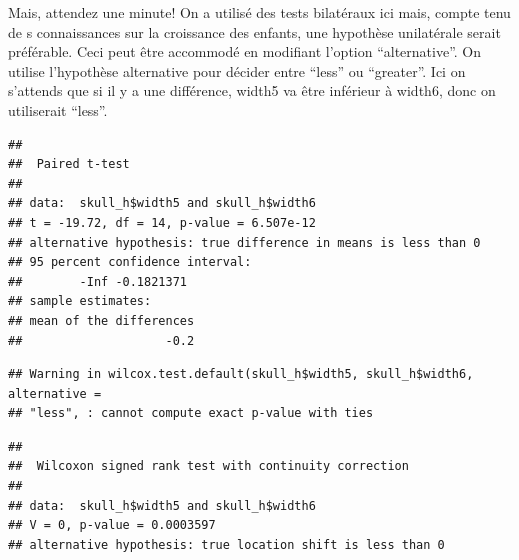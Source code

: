 \documentclass[
  12pt,
]{book}
\newenvironment{Shaded}{\begin{snugshade}}{\end{snugshade}}
\newcommand{\DataTypeTok}[1]{\textcolor[rgb]{0.13,0.29,0.53}{#1}}
\newcommand{\KeywordTok}[1]{\textcolor[rgb]{0.13,0.29,0.53}{\textbf{#1}}}
\newcommand{\NormalTok}[1]{#1}
\newcommand{\OperatorTok}[1]{\textcolor[rgb]{0.81,0.36,0.00}{\textbf{#1}}}
\newcommand{\OtherTok}[1]{\textcolor[rgb]{0.56,0.35,0.01}{#1}}
\newcommand{\StringTok}[1]{\textcolor[rgb]{0.31,0.60,0.02}{#1}}
\begin{document}
Mais, attendez une minute! On a utilisé des tests bilatéraux ici mais, compte tenu de s connaissances sur la croissance des enfants, une hypothèse unilatérale serait préférable. Ceci peut être accommodé en modifiant l'option ``alternative''. On utilise l'hypothèse alternative pour décider entre ``less'' ou ``greater''. Ici on s'attends que si il y a une différence, width5 va être inférieur à width6, donc on utiliserait ``less''.

\begin{Shaded}
\end{Shaded}

\begin{verbatim}
## 
##  Paired t-test
## 
## data:  skull_h$width5 and skull_h$width6
## t = -19.72, df = 14, p-value = 6.507e-12
## alternative hypothesis: true difference in means is less than 0
## 95 percent confidence interval:
##        -Inf -0.1821371
## sample estimates:
## mean of the differences 
##                    -0.2
\end{verbatim}

\begin{Shaded}
\end{Shaded}

\begin{verbatim}
## Warning in wilcox.test.default(skull_h$width5, skull_h$width6, alternative =
## "less", : cannot compute exact p-value with ties
\end{verbatim}

\begin{verbatim}
## 
##  Wilcoxon signed rank test with continuity correction
## 
## data:  skull_h$width5 and skull_h$width6
## V = 0, p-value = 0.0003597
## alternative hypothesis: true location shift is less than 0
\end{verbatim}
\end{document}
